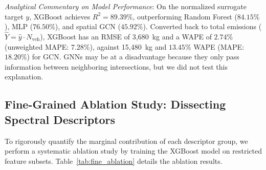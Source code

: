 \documentclass[journal]{IEEEtran}
\begin{document}
\textit{Analytical Commentary on Model Performance}:
On the normalized surrogate target $y$, XGBoost achieves $R^2 = 89.39\%$, outperforming Random Forest ($84.15\%$), MLP ($76.50\%$), and spatial GCN ($45.92\%$). Converted back to total emissions ($\hat{Y} = \hat{y} \cdot N_{\text{veh}}$), XGBoost has an RMSE of 3,680~kg and a WAPE of $2.74\%$ (unweighted MAPE: $7.28\%$), against 15,480~kg and $13.45\%$ WAPE (MAPE: $18.20\%$) for GCN. GNNs may be at a disadvantage because they only pass information between neighboring intersections, but we did not test this explanation.

\subsection{Fine-Grained Ablation Study: Dissecting Spectral Descriptors}
To rigorously quantify the marginal contribution of each descriptor group, we perform a systematic ablation study by training the XGBoost model on restricted feature subsets. Table~\ref{tab:fine_ablation} details the ablation results.

\begin{table}[htbp]
\caption{Systematic Fine-Grained Ablation Analysis of Spectral and Topological Sub-Components}
\label{tab:fine_ablation}
\centering
{}
\end{table}
\end{document}
